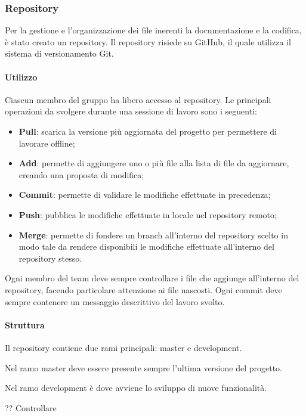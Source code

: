 \documentclass[../NormeProgetto.tex]{subfiles}
\begin{document}
		\subsubsection{Repository}
		Per la gestione e l'organizzazione dei file inerenti la documentazione e la codifica, è stato creato un repository. Il repository risiede su GitHub, il quale utilizza il sistema di versionamento Git.
		\paragraph{Utilizzo}
		Ciascun membro del gruppo ha libero accesso al repository. Le principali operazioni da svolgere durante una sessione di lavoro sono i seguenti:
		\begin{itemize}
		\item \textbf{Pull}: scarica la versione più aggiornata del progetto per permettere di lavorare offline;
		\item \textbf{Add}: permette di aggiungere uno o più file alla lista di file da aggiornare, creando una proposta di modifica;
		\item \textbf{Commit}: permette di validare le modifiche effettuate in precedenza;
		\item \textbf{Push}: pubblica le modifiche effettuate in locale nel repository remoto;
		\item \textbf{Merge}: permette di fondere un branch all'interno del repository scelto in modo tale da rendere disponibili le modifiche effettuate all'interno del repository stesso.
		\end{itemize}
		Ogni membro del team deve sempre controllare i file che aggiunge all'interno del repository, facendo particolare attenzione ai file nascosti. Ogni commit deve sempre contenere un messaggio descrittivo del lavoro svolto.
		\paragraph{Struttura}
		Il repository contiene due rami principali: master e development.
		
		Nel ramo master deve essere presente sempre l'ultima versione del progetto.
		
		Nel ramo development è dove avviene lo sviluppo di nuove funzionalità.
		
		?? Controllare
\end{document}
